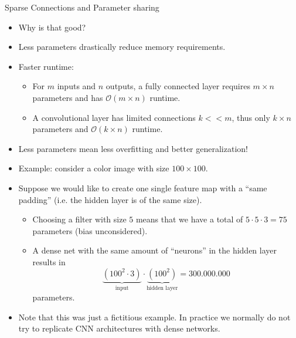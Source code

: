 {\begin{itemize}
  \end{itemize}

}
\begin{vbframe}{Sparse Connections and Parameter sharing}
  \begin{itemize}
    \item Why is that good?
    \item Less parameters drastically reduce memory requirements.
    \item Faster runtime:
    \begin{itemize}
      \item For $m$ inputs and $n$ outputs, a fully connected layer requires $m\times n$ parameters and has $\mathcal{O}(m\times n)$ runtime.
      \item A convolutional layer has limited connections $k<<m$, thus only $k\times n$ parameters and $\mathcal{O}(k\times n)$ runtime.
    \end{itemize}
    \item Less parameters mean less overfitting and better generalization!
  \end{itemize}
\framebreak
  \begin{itemize}
    \item Example: consider a color image with size $100 \times 100$.
    \item Suppose we would like to create one single feature map with a \enquote{same padding} (i.e. the hidden layer is of the same size).
    \begin{itemize}
      \item Choosing a filter with size $5$ means that we have a total of $5 \cdot 5 \cdot 3 = 75$ parameters (bias unconsidered).
      \item A dense net with the same amount of \enquote{neurons} in the hidden layer results in 
      $$\underbrace{(100^2 \cdot 3)}_{\text{input}} \cdot \underbrace{(100^2)}_{\text{hidden layer}} = 300.000.000 $$ parameters.
      
      
    \end{itemize}
  \item Note that this was just a fictitious example. In practice we normally do not try to replicate CNN architectures with dense networks.
  \end{itemize}
\end{vbframe}

